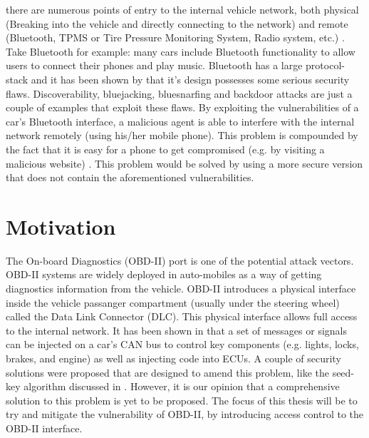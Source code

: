 there are numerous points of entry to the internal vehicle network, both physical (Breaking into the vehicle and directly connecting to the network) and remote (Bluetooth, TPMS or Tire Pressure Monitoring System, Radio system, etc.) \cite{MillerA}. Take Bluetooth for example: many cars include Bluetooth functionality to allow users to connect their phones and play music. Bluetooth has a large protocol-stack and it has been shown by \cite{Bluetooth} that it's design possesses some serious security flaws. Discoverability, bluejacking, bluesnarfing and backdoor attacks are just a couple of examples that exploit these flaws. By exploiting the vulnerabilities of a car's Bluetooth interface, a malicious agent is able to interfere with the internal network remotely (using his/her mobile phone). This problem is compounded by the fact that it is easy for a phone to get compromised (e.g. by visiting a malicious website) \cite{Yadav16}. This problem would be solved by using a more secure version that does not contain the aforementioned vulnerabilities.



\section{Motivation}
\label{sec:motivation}

The On-board Diagnostics (OBD-II) port is one of the potential attack vectors.  OBD-II systems are widely deployed in auto-mobiles as a way of getting diagnostics information from the vehicle. OBD-II introduces a physical interface inside the vehicle passanger compartment (usually under the steering wheel) called the Data Link Connector (DLC). This physical interface allows full access to the internal network. It has been shown in \cite{MillerA,Yadav16,MillerB,MillerC} that a set of messages or signals can be injected on a car's CAN bus to control key components (e.g. lights, locks, brakes, and engine) as well as injecting code into ECUs. A couple of security solutions were proposed that are designed to amend this problem, like the seed-key algorithm discussed in \cite{Yadav16}. However, it is our opinion that a comprehensive solution to this problem is yet to be proposed. The focus of this thesis will be to try and mitigate the vulnerability of OBD-II, by introducing access control to the OBD-II interface. 

 

